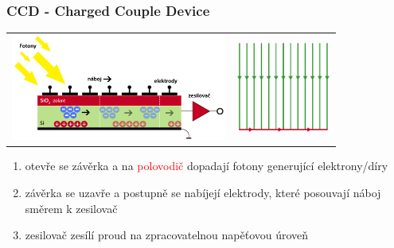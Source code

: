 \documentclass{beamer}
\begin{document}

	\begin{frame}[t,fragile]
		\frametitle{CCD - Charged Couple Device}
		\begin{tabular}{ll}
			\includegraphics[height=35mm]{ccd.pdf} &		
			\includegraphics[height=30mm]{2dccd.pdf}
		\end{tabular}
		\begin{enumerate}		
			\item otevře se závěrka a na \textcolor{red}{polovodič} dopadají fotony generující elektrony/díry
			\item závěrka se uzavře a postupně se nabíjejí elektrody, které posouvají náboj směrem k zesilovač
			\item zesilovač zesílí proud na zpracovatelnou napěťovou úroveň
		\end{enumerate}	
		
	\end{frame}
	
\end{document}
